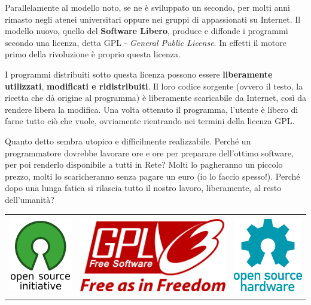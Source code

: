 \documentclass[a4paper, 12pt]{extarticle}
\begin{document}
Parallelamente al modello noto, se ne è sviluppato un secondo, per
molti anni rimasto negli atenei universitari oppure nei gruppi di
appassionati su Internet. Il modello nuovo, quello del \textbf{Software
Libero}, produce e diffonde i programmi secondo una licenza, detta GPL
- \textit{General Public License}. In effetti il motore primo della
rivoluzione è proprio questa licenza.

I programmi distribuiti sotto questa licenza possono essere
\textbf{liberamente utilizzati}, \textbf{modificati e ridistribuiti}.
Il loro codice sorgente (ovvero il testo, la ricetta che dà origine al
programma) è liberamente scaricabile da Internet, così da rendere
libera la modifica. Una volta ottenuto il programma, l'utente è libero
di farne tutto ciò che vuole, ovviamente rientrando nei termini della
licenza GPL.

Quanto detto sembra utopico e difficilmente realizzabile. Perché un
programmatore dovrebbe lavorare ore e ore per preparare dell'ottimo
software, per poi renderlo disponibile a tutti in Rete? Molti lo
pagheranno un piccolo prezzo, molti lo scaricheranno senza pagare un
euro (io lo faccio spesso!). Perché dopo una lunga fatica si rilascia
tutto il nostro lavoro, liberamente, al resto dell'umanità?

\vspace{1em}

  \begin{tabular}[h]{ccc}
  \includegraphics[height=3.5cm]{img/opuscolo-4.png}
  &
  \includegraphics[height=3.5cm]{img/opuscolo-5.png}
  &
  \includegraphics[height=3.5cm]{img/opuscolo-6.png}
  \end{tabular}
\end{document}
